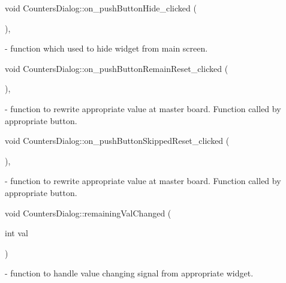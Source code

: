 {\setlength{\rightskip}{0pt plus 5cm}void Counters\+Dialog\+::{\texorpdfstring{on\+\_\+push\+Button\+Hide\+\_\+clicked}{on_pushButtonHide_clicked}} (
\begin{DoxyParamCaption}
{}
\end{DoxyParamCaption}
)\hspace{0.3cm}{\ttfamily [private]}, {\ttfamily [slot]}}\hypertarget{classCountersDialog_ac5e601c868667428b7cea2b53bfd674a}{}\label{classCountersDialog_ac5e601c868667428b7cea2b53bfd674a} - function which used to hide widget from main screen.


{\setlength{\rightskip}{0pt plus 5cm}void Counters\+Dialog\+::{\texorpdfstring{on\+\_\+push\+Button\+Remain\+Reset\+\_\+clicked}{on_pushButtonRemainReset_clicked}} (
\begin{DoxyParamCaption}
{}
\end{DoxyParamCaption}
)\hspace{0.3cm}{\ttfamily [private]}, {\ttfamily [slot]}}\hypertarget{classCountersDialog_a8e6ebaa6a437926644028d4fbf255a2d}{}\label{classCountersDialog_a8e6ebaa6a437926644028d4fbf255a2d}
  - function to rewrite appropriate value at master board. Function called by appropriate button.


{\setlength{\rightskip}{0pt plus 5cm}void Counters\+Dialog\+::{\texorpdfstring{on\+\_\+push\+Button\+Skipped\+Reset\+\_\+clicked}{on_pushButtonSkippedReset_clicked}} (
\begin{DoxyParamCaption}
{}
\end{DoxyParamCaption}
)\hspace{0.3cm}{\ttfamily [private]}, {\ttfamily [slot]}} - function to rewrite appropriate value at master board. Function called by appropriate button.

\hypertarget{classCountersDialog_aaa042f36e6a251055f135e67cfe711d6}{}\label{classCountersDialog_aaa042f36e6a251055f135e67cfe711d6}
{\setlength{\rightskip}{0pt plus 5cm}void Counters\+Dialog\+::{\texorpdfstring{remaining\+Val\+Changed}{remainingValChanged}} (
\begin{DoxyParamCaption}
\item[{int}]{val}
\end{DoxyParamCaption}
)\hspace{0.3cm}{\ttfamily [signal]}} - function to handle value changing signal from appropriate widget.

